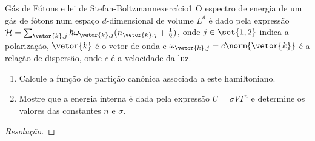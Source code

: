 \begin{exercício}{Gás de Fótons e lei de Stefan-Boltzmann}{exercício1}
    O espectro de energia de um gás de fótons num espaço \(d\)-dimensional de volume \(L^d\) é dado pela expressão \(\mathcal{H} = \sum_{\vetor{k}, j} \hbar \omega_{\vetor{k}, j}(n_{\vetor{k}, j} + \frac12)\), onde \(j \in \set{1,2}\) indica a polarização, \(\vetor{k}\) é o vetor de onda e \(\omega_{\vetor{k},j} = c\norm{\vetor{k}}\) é a relação de dispersão, onde \(c\) é a velocidade da luz.
    \begin{enumerate}[label=(\alph*)]
        \item Calcule a função de partição canônica associada a este hamiltoniano.
        \item Mostre que a energia interna é dada pela expressão \(U = \sigma V T^n\) e determine os valores das constantes \(n\) e \(\sigma\).
    \end{enumerate}
\end{exercício}
\begin{proof}[Resolução]

\end{proof}
